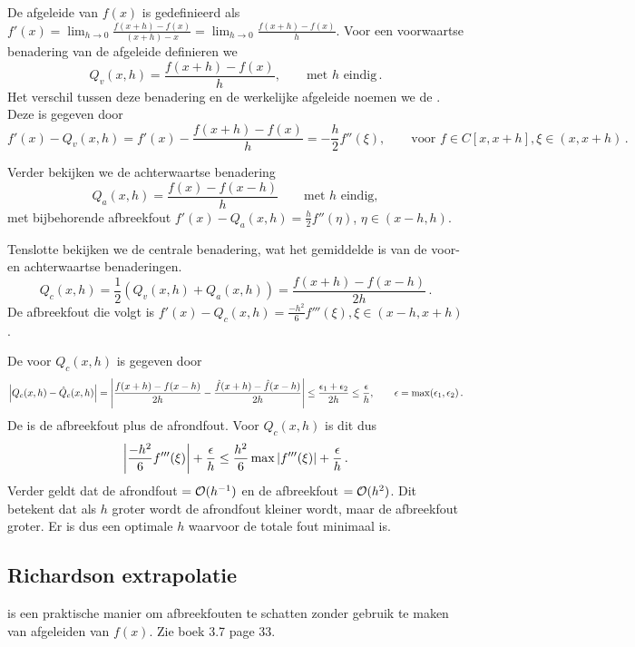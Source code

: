 \documentclass{2wn20summary}
\begin{document}
			\begin{define}
				De afgeleide van $ f(x) $ is gedefinieerd als $ f'(x) = \lim_{h \to 0} \frac{f(x+h)-f(x)}{(x+h) - x} = \lim_{h \to 0} \frac{f(x+h)-f(x)}{h} $. Voor een voorwaartse benadering van de afgeleide definieren we 
				\[ 
					Q_v(x,h) = \frac{f(x+h)-f(x)}{h}, \qquad \text{met $h$ eindig} \,.
				\]
				Het verschil tussen deze benadering en de werkelijke afgeleide noemen we de . Deze is gegeven door
				\[ 
					f'(x) - Q_v(x,h) = f'(x) -  \frac{f(x+h)-f(x)}{h} = - \frac{h}{2} f ''(\xi), \qquad \text{voor } f \in C[x,x+h], \xi \in (x,x+h)\,.
				\]
				
				Verder bekijken we de achterwaartse benadering 
				\[ 
					 Q_a(x,h) = \frac{f(x)-f(x-h)}{h} \qquad \text{met $h$ eindig} ,
				\]
				met bijbehorende afbreekfout $ f'(x) - Q_a(x,h) = \frac{h}{2} f ''(\eta) $, $\eta \in (x-h,h)$.
				
				Tenslotte bekijken we de centrale benadering, wat het gemiddelde is van de voor- en achterwaartse benaderingen. 
				\[ 
					Q_c(x,h) = \frac{1}{2} (Q_v(x,h) + Q_a(x,h)) = \frac{f(x+h)-f(x-h)}{2h}\,.
				\]
				De afbreekfout die volgt is $ f'(x) - Q_c(x,h) = \frac{-h^2}{6} f'''(\xi), \xi \in (x-h, x+h) $.
			\end{define}

			\begin{define}
				De   voor $ Q_c(x,h) $ is gegeven door
				\[
					\abs{Q_c(x,h) - \hat{Q}_c(x,h)} = \abs{\frac{f(x+h)-f(x-h)}{2h}- \frac{\hat{f}(x+h) - \hat{f}(x-h)}{2h}} \leq \frac{\epsilon_1 + \epsilon_2}{2h} \leq \frac{\epsilon}{h}, \qquad \epsilon = \max (\epsilon_1, \epsilon_2)\,.
				\]
				De  is de afbreekfout plus de afrondfout. Voor $ Q_c(x,h) $ is dit dus
				\[
					\abs{\frac{-h^2}{6}f'''(\xi)} + \frac{\epsilon}{h} \leq \frac{h^2}{6}\max\abs{f'''(\xi)}+ \frac{\epsilon}{h}\,.
				\]
				Verder geldt dat de afrondfout $ = \mathcal{O}(h^{-1}) $ en de afbreekfout $ = \mathcal{O}(h^2) $. Dit betekent dat als $h$ groter wordt de afrondfout kleiner wordt, maar de afbreekfout groter. Er is dus een optimale $h$ waarvoor de totale fout minimaal is.
			\end{define}

		\subsection{Richardson extrapolatie}
			 is een praktische manier om afbreekfouten te schatten zonder gebruik te maken van afgeleiden van $ f(x) $. Zie boek 3.7 page 33.
\end{document}
